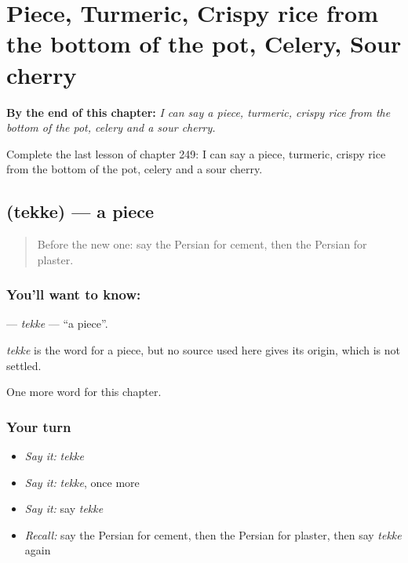 
\chapter{Piece, Turmeric, Crispy rice from the bottom of the pot, Celery, Sour cherry}
\label{ch:fa-piece-turmeric-crispy-rice-from-the-bottom-of-the-pot-celery-sour-cherry}

\begin{chapteropening}
\textbf{By the end of this chapter:} \emph{I can say a piece, turmeric, crispy rice from the bottom of the pot, celery and a sour cherry.}

Complete the last lesson of chapter 249: I can say a piece, turmeric, crispy rice from the bottom of the pot, celery and a sour cherry.
\end{chapteropening}

\section[\texorpdfstring{\fa{تکه} (tekke)}{تکه (tekke)}]{ (tekke) — a piece}

\label{lesson:FA-C249-tekke}



\begin{quote}
Before the new one: say the Persian for cement, then the Persian for plaster.
\end{quote}

\subsection*{You'll want to know: }
\textbf{} — \emph{tekke} — \textquotedblleft{}a piece\textquotedblright{}.

\begin{cousinweb}
\emph{tekke} is the word for a piece, but no source used here gives its origin, which is not settled.
\end{cousinweb}

\begin{grammarlens}[title={What you've built}]
One more word for this chapter.
\end{grammarlens}

\subsection*{Your turn}
\begin{itemize}
\raggedright
  \item \emph{Say it:} \emph{tekke}
  \item \emph{Say it:} \emph{tekke}, once more
  \item \emph{Say it:} say \emph{tekke}
  \item \emph{Recall:} say the Persian for cement, then the Persian for plaster, then say \emph{tekke} again
\end{itemize}

